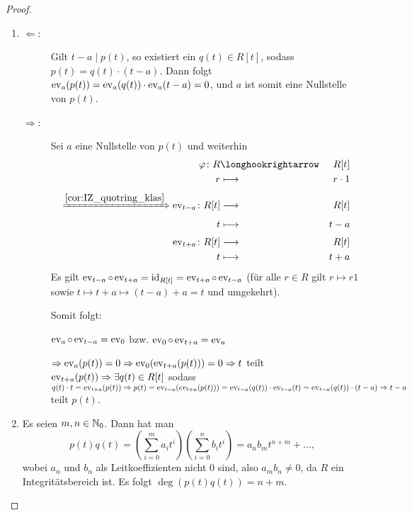 \documentclass[12pt,a4paper]{scrartcl}
\begin{document}
\begin{proof}
	\leavevmode
	\begin{enumerate}
		\item \begin{description}
			\item[\glqq$\Leftarrow$\grqq:] Gilt $t-a \mid p(t)$, so existiert ein $q(t) \in R[t]$, sodass $p(t) = q(t)\cdot (t-a)$. Dann folgt $\operatorname{ev}_a (p(t)) = \operatorname{ev}_a(q(t))\cdot\operatorname{ev}_a(t-a) = 0$, und $a$ ist somit eine Nullstelle von $p(t)$.
			\item[\glqq$\Rightarrow$\grqq:] Sei $a$ eine Nullstelle von $p(t)$ und weiterhin
			\begin{eqnarray*} %
				\phi\colon R&\longhookrightarrow & R[t]\\
				r & \longmapsto & r\cdot 1\\[1mm]
				\xRightarrow{\ref{cor:IZ_quotring_klas}} \ev_{t-a} \colon R[t]& \longto & R[t]\\
				t&\longmapsto &t-a\\[1mm]
				\ev_{t+a}\colon R[t] & \longto & R[t]\\
				t & \longmapsto & t+a
			\end{eqnarray*}
			Es gilt $\operatorname{ev}_{t-a}\circ \operatorname{ev}_{t+a} = \operatorname{id}_{R[t]} = \operatorname{ev}_{t+a}\circ \operatorname{ev}_{t-a}$
			(für alle $r\in R$ gilt $r \mapsto r1$ sowie $t\mapsto t+a\mapsto (t-a)+a = t$ und umgekehrt).
			
			Somit folgt:
			\begin{center}
			\end{center}
			$\operatorname{ev}_a \circ \operatorname{ev}_{t-a} = \operatorname{ev}_0$ bzw. $\operatorname{ev}_0\circ \operatorname{ev}_{t+a} = \operatorname{ev}_a$
			
			$\Rightarrow \operatorname{ev}_a(p(t)) = 0\Rightarrow \operatorname{ev}_0(\operatorname{ev}_{t+a}(p(t))) = 0\Rightarrow t$ teilt $\operatorname{ev}_{t+a}(p(t))\Rightarrow \exists q(t)\in R[t]$ sodass $q(t)\cdot t = \operatorname{ev}_{t+a}(p(t))\Rightarrow p(t) = \operatorname{ev}_{t-a}(ev_{t+a}(p(t))) = \operatorname{ev}_{t-a}(q(t))\cdot \operatorname{ev}_{t-a}(t) = \operatorname{ev}_{t-a}(q(t)) \cdot(t-a)\Rightarrow t-a$ teilt $p(t)$.
		\end{description}
		\item Es seien $m,n\in\mathbb N_0$. Dann hat man
		\[p(t)q(t) = \left(\sum_{i = 0}^{m}a_it^i\right)\left(\sum_{i = 0}^{n}b_it^i\right) = a_nb_mt^{n+m}+\dots,\] wobei $a_n$ und $b_n$ als Leitkoeffizienten nicht $0$ sind, also $a_mb_n\neq 0$, da $R$ ein Integritätsbereich ist. Es folgt $\deg(p(t)q(t)) = n+m$.
		

\end{enumerate}
\end{proof}
\end{document}
